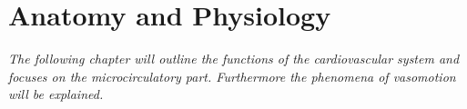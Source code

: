 \chapter{Anatomy and Physiology}
\textit{The following chapter will outline the functions of the cardiovascular system and focuses on the microcirculatory part. Furthermore the phenomena of vasomotion will be explained.}